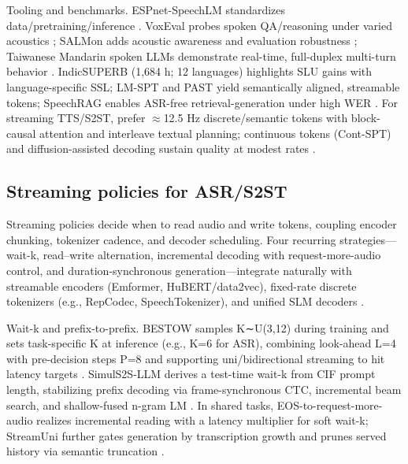\documentclass{article}
\begin{document}
Tooling and benchmarks. ESPnet-SpeechLM standardizes data/pretraining/inference \cite{tian2025espnetspeechlmopenspeechlanguagemodeltoo}. VoxEval probes spoken QA/reasoning under varied acoustics \cite{cui2025voxevalbenchmarkingknowledgeunderstandin}; SALMon adds acoustic awareness and evaluation robustness \cite{maimon2025salmonsuiteacousticlanguagemodelevaluati}; Taiwanese Mandarin spoken LLMs demonstrate real-time, full-duplex multi-turn behavior \cite{yang2024buildingtaiwanesemandarinspokenlanguagem}. IndicSUPERB (1,684 h; 12 languages) highlights SLU gains with language-specific SSL; LM-SPT and PAST yield semantically aligned, streamable tokens; SpeechRAG enables ASR-free retrieval-generation under high WER \cite{entry2025indicsuperbspeechprocessinguniversalperf,jo2025lmsptalignedsemanticdistillationspeechto,har-tuv2025pastphoneticacousticspeechtokenizer,min2025speechretrievalaugmentedgenerationwithou}. For streaming TTS/S2ST, prefer $\approx$12.5 Hz discrete/semantic tokens with block-causal attention and interleave textual planning; continuous tokens (Cont-SPT) and diffusion-assisted decoding sustain quality at modest rates \cite{li2025continuousspeechtokenizertext,bai2025dmelspeechtokenizationmadesimple,zhao2024textlessstreamingspeechtranslationsemant,yang2025diffsoundstreamefficientspeechtokenizati}.



\subsection{Streaming policies for ASR/S2ST} \label{subsec:streamingpoliciesforasrs2st}

Streaming policies decide when to read audio and write tokens, coupling encoder chunking, tokenizer cadence, and decoder scheduling. Four recurring strategies---wait-k, read--write alternation, incremental decoding with request-more-audio control, and duration-synchronous generation---integrate naturally with streamable encoders (Emformer, HuBERT/data2vec), fixed-rate discrete tokenizers (e.g., RepCodec, SpeechTokenizer), and unified SLM decoders \cite{huang2024repcodecspeechrepresentationcodectokeniz,zhang2024speechtokenizerunifiedspeechtokenizerlar}.

Wait-k and prefix-to-prefix. BESTOW samples K∼U(3,12) during training and sets task-specific K at inference (e.g., K=6 for ASR), combining look-ahead L=4 with pre-decision steps P=8 and supporting uni/bidirectional streaming to hit latency targets \cite{chen2024bestowefficientstreamablespeechlanguagem}. SimulS2S-LLM derives a test-time wait-k from CIF prompt length, stabilizing prefix decoding via frame-synchronous CTC, incremental beam search, and shallow-fused n-gram LM \cite{deng2025simuls2sllmunlockingsimultaneousinferenc}. In shared tasks, EOS-to-request-more-audio realizes incremental reading with a latency multiplier for soft wait-k; StreamUni further gates generation by transcription growth and prunes served history via semantic truncation \cite{ouyang2025cmusiwslt2025simultaneousspeechtranslati,guo2025streamuniachievingstreamingspeechtransla}.
\end{document}
